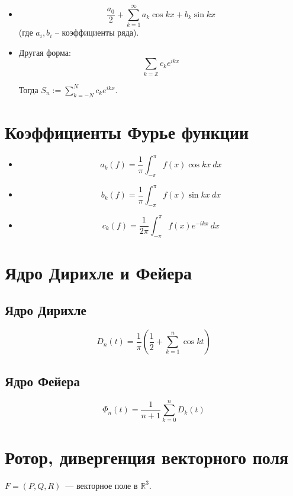 \documentclass[paper=a4, fontsize=17pt]{article}
\begin{document}
	\begin{itemize}
		\item $$ \frac{a_0}{2}  + \sum_{k = 1}^{\infty} a_k\cos kx + b_k\sin kx $$
		(где $ a_i, b_i $ -- коэффициенты ряда).

		\item Другая форма:	$$ \sum_{k = \mathbb{Z}} c_k e^{ikx} $$

		Тогда $ S_n := \sum_{k = -N}^{N} c_k e^{ikx} $.
	\end{itemize}

	\section{Коэффициенты Фурье функции}

	\begin{itemize}
		\item $$ a_k(f) = \frac{1}{\pi} \int_{-\pi}^{\pi} f(x) \cos kx ~ dx $$

		\item $$ b_k(f) = \frac{1}{\pi} \int_{-\pi}^{\pi} f(x) \sin kx ~ dx $$

		\item $$ c_k(f) = \frac{1}{2\pi} \int_{-\pi}^{\pi} f(x) e^{-ikx} ~ dx $$

	\end{itemize}

	\section{Ядро Дирихле и Фейера}

	\subsection{Ядро Дирихле}

	$$ D_n(t) = \frac{1}{\pi}( \frac{1}{2} + \sum_{k = 1}^{n} \cos kt) $$

	\subsection{Ядро Фейера}

	$$ \Phi_n(t) = \frac{1}{n+1} \sum_{k = 0}^{n} D_k(t) $$

	\section{Ротор, дивергенция векторного поля}
    $F = (P, Q, R)$~--- векторное поле в $\mathds{R}^3$.
\end{document}
